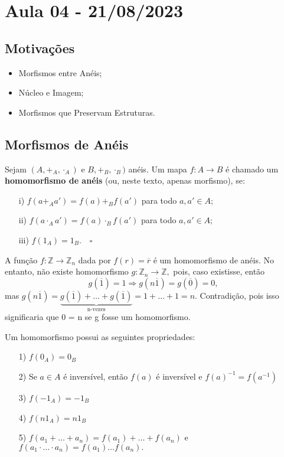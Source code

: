 \documentclass[algebraII_notes.tex]{subfiles}
\begin{document}
\section{Aula 04 - 21/08/2023}
\subsection{Motivações}
\begin{itemize}
	\item Morfismos entre Anéis;
	\item Núcleo e Imagem;
	\item Morfismos que Preservam Estruturas.
\end{itemize}
\subsection{Morfismos de Anéis}
\begin{def*}
	Sejam \((A, +_{A}, \cdot_{A})\) e \(B, +_{B}, \cdot_{B})\) anéis. Um mapa \(f:A\rightarrow B\) é chamado um \textbf{homomorfismo de anéis}
	(ou, neste texto, apenas morfismo), se:
	\begin{itemize}
		\item[i)] \(f(a +_{A} a') = f(a) +_{B} f(a')\) para todo \(a, a'\in A;\)
		\item[ii)] \(f(a \cdot_{A} a') = f(a)\cdot_{B}f(a')\) para todo \(a, a'\in A;\)
		\item[iii)] \(f(1_{A}) = 1_{B}.\quad\square\)
	\end{itemize}
\end{def*}
\begin{example}
	A função \(f:\mathbb{Z}\rightarrow \mathbb{Z}_{n}\) dada por \(f(r) = \overline{r}\) é um homomorfismo de anéis. No entanto, não existe homomorfismo
	\(g:\mathbb{Z}_{n}\rightarrow \mathbb{Z},\) pois, caso existisse, então
	\[
		g(\overline{1}) = 1 \Rightarrow g(n\overline{1}) = g(\overline{0}) = 0,
	\]
	mas \(g(n\overline{1}) = \underbrace{g(\overline{1}) + \dotsc + g(\overline{1})}_{\text{n-vezes}} = 1 + \dotsc + 1 = n\). Contradição, pois isso
	significaria que 0 = n se g fosse um homomorfismo.
\end{example}
\begin{lemma*}
	Um homomorfismo possui as seguintes propriedades:
	\begin{itemize}
		\item[1)] \(f(0_{A}) = 0_{B}\)
		\item[2)] Se \(a\in A\) é inversível, então \(f(a)\) é inversível e \(f(a)^{-1} = f(a^{-1})\)
		\item[3)] \(f(-1_{A}) = -1_{B}\)
		\item[4)] \(f(n1_{A}) = n1_{B}\)
		\item[5)] \(f(a_{1} + \dotsc + a_{n}) = f(a_{1})+\dotsc +f(a_{n})\) e \(f(a_{1}\cdot \dotsc \cdot a_{n}) = f(a_{1})\dotsc f(a_{n}).\)
	\end{itemize}
\end{lemma*}
\end{document}
